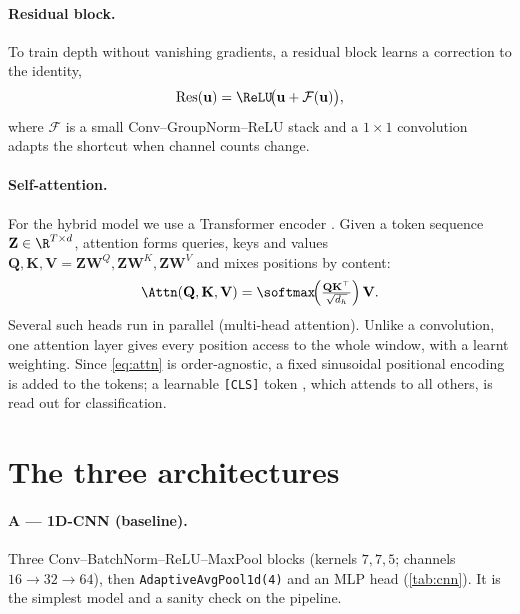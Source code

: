 \paragraph{Residual block.} To train depth without vanishing gradients, a
residual block \cite{he2016deep} learns a correction to the identity,
\begin{equation}
    \mathrm{Res}(\mathbf{u}) = \ReLU\!\big(\mathbf{u} + \mathcal{F}(\mathbf{u})\big),
    \label{eq:res}
\end{equation}
where $\mathcal{F}$ is a small Conv--GroupNorm--ReLU stack and a $1{\times}1$
convolution adapts the shortcut when channel counts change.

\paragraph{Self-attention.} For the hybrid model we use a Transformer encoder
\cite{vaswani2017attention}. Given a token sequence $\mathbf{Z}\in\R^{T\times d}$,
attention forms queries, keys and values
$\mathbf{Q},\mathbf{K},\mathbf{V}=\mathbf{Z}\mathbf{W}^{Q},\mathbf{Z}\mathbf{W}^{K},\mathbf{Z}\mathbf{W}^{V}$
and mixes positions by content:
\begin{equation}
    \Attn(\mathbf{Q},\mathbf{K},\mathbf{V})
    = \softmax\!\Big(\tfrac{\mathbf{Q}\mathbf{K}^{\top}}{\sqrt{d_h}}\Big)\,\mathbf{V}.
    \label{eq:attn}
\end{equation}
Several such heads run in parallel (multi-head attention). Unlike a convolution,
one attention layer gives every position access to the whole window, with a
learnt weighting. Since \cref{eq:attn} is order-agnostic, a fixed sinusoidal
positional encoding is added to the tokens; a learnable \texttt{[CLS]} token
\cite{devlin2019bert}, which attends to all others, is read out for
classification.

\section{The three architectures}
\label{sec:arch}

\paragraph{A --- 1D-CNN (baseline).} Three Conv--BatchNorm--ReLU--MaxPool blocks
(kernels $7,7,5$; channels $16\!\to\!32\!\to\!64$), then
\texttt{AdaptiveAvgPool1d(4)} and an MLP head (\cref{tab:cnn}). It is the
simplest model and a sanity check on the pipeline.

